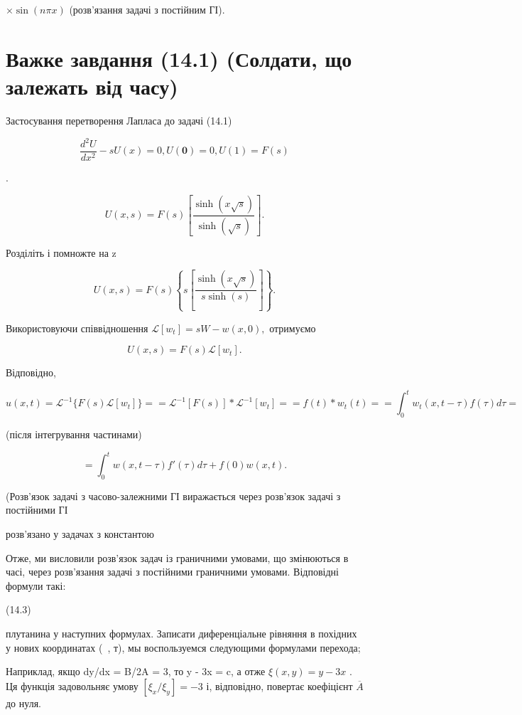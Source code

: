\documentclass[
  ukrainian,
]{article}
\begin{document}
\(\times \sin(n\pi x)\) (розв'язання задачі з постійним ГІ).

\section{Важке завдання (14.1) (Солдати, що залежать від
часу)}\label{ux432ux430ux436ux43aux435-ux437ux430ux432ux434ux430ux43dux43dux44f-14.1-ux441ux43eux43bux434ux430ux442ux438-ux449ux43e-ux437ux430ux43bux435ux436ux430ux442ux44c-ux432ux456ux434-ux447ux430ux441ux443}

Застосування перетворення Лапласа до задачі (14.1)

\[
\frac{d^2U}{dx^2} - sU(x) = 0,
U\left( \mathbf{0}\right) =0,
U(1) = F(s)
\]

.

\[
U(x, s) = F(s) \left[ \frac{\sinh(x \sqrt{s})}{\sinh(\sqrt{s})} \right].
\]

Розділіть і помножте на z

\[
U(x, s) = F(s) \left\{ s \left[ \frac{\sinh(x \sqrt{s})}{s \sinh(s)} \right] \right\}.
\]

Використовуючи співвідношення \(\mathscr{L}[w_t] = sW - w(x, 0),\)
отримуємо

\[
U(x, s) = F(s) \mathcal{L}[w_t].
\]

Відповідно,

\[
u(x, t) = \mathcal{L}^{-1} \{ F(s) \mathcal{L}[w_t] \} =
= \mathcal{L}^{-1} [ F(s) ] * \mathcal{L}^{-1}[w_t] =
= f(t) * w_t(t) =
= \int_0^t w_t(x, t-\tau) f(\tau) d\tau =
\]

(після інтегрування частинами)

\[
= \int_{0}^{t} w(x, t-\tau) f'(\tau) d\tau + f(0) w(x, t).
\]

(Розв'язок задачі з часово-залежними ГІ виражається через розв'язок
задачі з постійними ГІ

розв'язано у задачах з константою

Отже, ми висловили розв'язок задач із граничними умовами, що змінюються
в часі, через розв'язання задачі з постійними граничними умовами.
Відповідні формули такі:

(14.3)

плутанина у наступних формулах. Записати диференціальне рівняння в
похідних у нових координатах (~, т), мы воспользуемся следующими
формулами перехода;

Наприклад, якщо dy/dx = B/2A = 3, то y - 3x = c, а отже
\(\xi(x, y) = y - 3x\) . Ця функція задовольняє умову
\([\xi_x/\xi_y] = -3\) і, відповідно, повертає коефіцієнт
\(\overline{A}\) до нуля.
\end{document}
